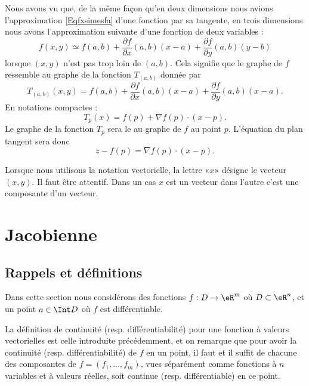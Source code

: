 Nous avons vu que, de la même façon qu'en deux dimensions nous avions l'approximation \eqref{Eqfxsimesfa} d'une fonction par sa tangente, en trois dimensions nous avons l'approximation suivante d'une fonction de deux variables :
\begin{equation}
	f(x,y)\simeq f(a,b)+\frac{ \partial f }{ \partial x }(a,b)(x-a)+\frac{ \partial f }{ \partial y }(a,b)(y-b)
\end{equation}
lorsque \( (x,y)\) n'est pas trop loin de \( (a,b)\). Cela signifie que le graphe de \( f\) ressemble au graphe de la fonction \( T_{(a,b)}\) donnée par
\begin{equation}
	T_{(a,b)}(x,y)=f(a,b)+\frac{ \partial f }{ \partial x }(a,b)(x-a)+\frac{ \partial f }{ \partial y }(a,b)(x-a).
\end{equation}
En notations compactes :
\begin{equation}
	T_p(x)=f(p)+\nabla f(p)\cdot (x-p).
\end{equation}
Le graphe de la fonction \( T_p\) sera le  au graphe de \( f\) au point \( p\). L'équation du plan tangent sera donc
\begin{equation}
	z-f(p)=\nabla f(p)\cdot (x-p).
\end{equation}

\begin{remark}
	Lorsque nous utilisons la notation vectorielle, la lettre «\( x\)» désigne le vecteur \( (x,y)\). Il faut être attentif. Dans un cas \( x\) est un vecteur dans l'autre c'est une composante d'un vecteur.
\end{remark}

\section{Jacobienne}

\subsection{Rappels et définitions}

Dans cette section nous considérons des fonctions \( f : D \to \eR^m\)
où \( D \subset \eR^n\), et un point \( a \in \Int D\) où \( f\) est
différentiable.
\begin{remark}
	La définition de continuité (resp. différentiabilité) pour une
	fonction à valeurs vectorielles est celle introduite précédemment,
	et on remarque que pour avoir la continuité
	(resp. différentiabilité) de \( f\) en un point, il faut et il suffit
	de chacune des composantes de \( f = (f_1,\ldots, f_m)\), vues
	séparément comme fonctions à \( n\) variables et à valeurs réelles,
	soit continue (resp. différentiable) en ce point.
\end{remark}


